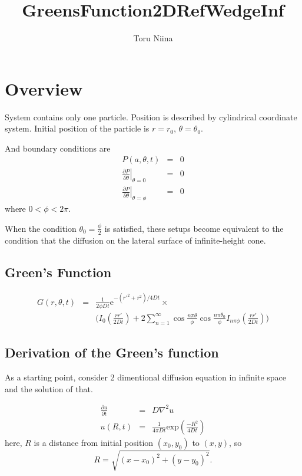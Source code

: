 \documentclass{article}
\begin{document}
\title{GreensFunction2DRefWedgeInf}
\author{Toru Niina}
\maketitle

\section{Overview}

System contains only one particle. 
 Position is described by cylindrical coordinate system.
 Initial position of the particle is $r = r_0$, $\theta = \theta_0$.

And boundary conditions are
\begin{eqnarray}
    P(a, \theta, t) &=& 0 \nonumber \\
    \left.\frac{\partial P}{\partial\theta}\right|_{\theta = 0} &=& 0 \nonumber \\
    \left.\frac{\partial P}{\partial\theta}\right|_{\theta = \phi} &=& 0
    \label{boundary-conditions}
\end{eqnarray}
where $0 < \phi < 2\pi$.

When the condition $\theta_0 = \frac{\phi}{2}$ is satisfied, 
 these setups become equivalent to the condition that
 the diffusion on the lateral surface of infinite-height cone.

\subsection{Green's Function}
\begin{eqnarray}
    G(r, \theta, t)
    &=& \frac{1}{2\phi Dt}\mathrm{e}^{-(r'^2 + r^2)/4Dt} \times\nonumber \\
    & & \Biggl(I_0\left(\frac{rr'}{2Dt}\right) + 
        2\sum^{\infty}_{n=1}\cos\frac{n\pi\theta}{\phi}\cos\frac{n\pi\theta_0}{\phi}
        I_{n\pi\phi}\left(\frac{rr'}{2Dt}\right) \Biggr)\label{greens-function}
\end{eqnarray}

\subsection{Derivation of the Green's function}
As a starting point, consider 2 dimentional diffusion equation in infinite space
and the solution of that.

\begin{eqnarray}
    \frac{\partial u}{\partial t} &=& D\nabla^2 u \\
    u(R, t) &=& \frac{1}{4\pi Dt}\mathrm{exp}\left(\frac{-R^2}{4Dt}\right)
\end{eqnarray}
here, $R$ is a distance from initial position $(x_0, y_0)$ to $(x, y)$, so
\begin{equation}
 R = \sqrt{(x-x_0)^2+(y-y_0)^2}.
\end{equation}
\end{document}
